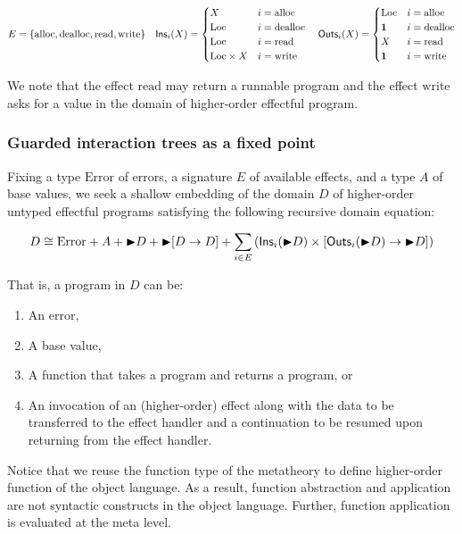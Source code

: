 \documentclass{article}
\theoremstyle{definition}
\theoremstyle{plain}
\theoremstyle{remark}
\newcommand{\Error}{\mathrm{Error}}
\newcommand{\Ins}{\mathsf{Ins}}
\newcommand{\Outs}{\mathsf{Outs}}
\newcommand{\efalloc}{\mathrm{alloc}}
\newcommand{\efdealloc}{\mathrm{dealloc}}
\newcommand{\efread}{\mathrm{read}}
\newcommand{\efwrite}{\mathrm{write}}
\begin{document}
\[
  E = \{\efalloc, \efdealloc, \efread, \efwrite\}
  \quad
  \Ins_i(X) = \begin{cases}
    X & i = \efalloc\\
    \iLoc & i = \efdealloc\\
    \iLoc & i = \efread\\
    \iLoc \times X & i = \efwrite\\
  \end{cases}
  \quad
  \Outs_i(X) = \begin{cases}
    \iLoc & i = \efalloc\\
    \mathbf{1} & i = \efdealloc\\
    X & i = \efread\\
    \mathbf{1} & i = \efwrite\\
  \end{cases}
\]

We note that the effect \(\efread\) may return a runnable program and the effect \(\efwrite\) asks for a value in the domain of higher-order effectful program.

\subsubsection{Guarded interaction trees as a fixed point}

Fixing a type \(\Error\) of errors, a signature \(E\) of available effects, and a type \(A\) of base values,
we seek a shallow embedding of the domain \(D\) of higher-order untyped effectful programs satisfying the following recursive domain equation:

\[
  D \cong \Error + A + \latert D + \latert [D \to D] + \sum_{i\in E} \left( \Ins_i(\latert D) \times [\Outs_i(\latert D) \to \latert D] \right)
\]

That is, a program in \(D\) can be:

\begin{enumerate}
  \item An error,
  \item A base value,
  \item A function that takes a program and returns a program, or
  \item An invocation of an (higher-order) effect along with the data to be transferred to the effect handler and a continuation to be resumed upon returning from the effect handler.
\end{enumerate}

Notice that we reuse the function type of the metatheory to define higher-order function of the object language.
As a result, function abstraction and application are not syntactic constructs in the object language.
Further, function application is evaluated at the meta level.\par
\end{document}
